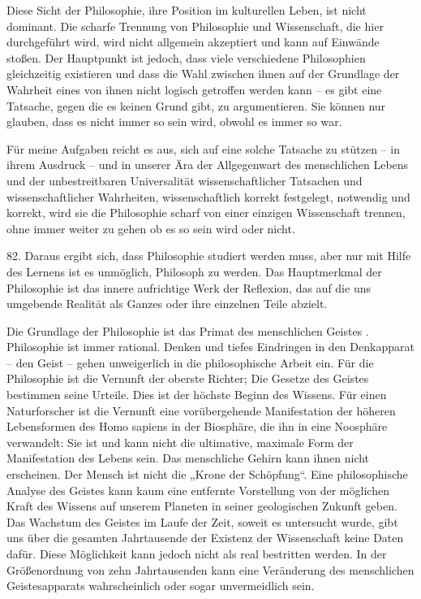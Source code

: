 \documentclass[11pt,a4paper]{book}
\begin{document}
Diese Sicht der Philosophie, ihre Position im kulturellen Leben, ist nicht dominant. Die scharfe Trennung von Philosophie und Wissenschaft, die hier durchgeführt wird, wird nicht allgemein akzeptiert und kann auf Einwände stoßen. Der Hauptpunkt ist jedoch, dass viele verschiedene Philosophien gleichzeitig existieren und dass die Wahl zwischen ihnen auf der Grundlage der Wahrheit eines von ihnen nicht logisch getroffen werden kann -- es gibt eine Tatsache, gegen die es keinen Grund gibt, zu argumentieren. Sie können nur glauben, dass es nicht immer so sein wird, obwohl es immer so war.



Für meine Aufgaben reicht es aus, sich auf eine solche Tatsache zu stützen -- in ihrem Ausdruck -- und in unserer Ära der Allgegenwart des menschlichen Lebens und der unbestreitbaren Universalität wissenschaftlicher Tatsachen und wissenschaftlicher Wahrheiten, wissenschaftlich korrekt festgelegt, notwendig und korrekt, wird sie die Philosophie scharf von einer einzigen Wissenschaft trennen, ohne immer weiter zu gehen ob es so sein wird oder nicht.



82. Daraus ergibt sich, dass Philosophie studiert werden muss, aber nur mit Hilfe des Lernens ist es unmöglich, Philosoph zu werden. Das Hauptmerkmal der Philosophie ist das innere aufrichtige Werk der Reflexion, das auf die uns umgebende Realität als Ganzes oder ihre einzelnen Teile abzielt.



Die Grundlage der Philosophie ist das Primat des menschlichen Geistes . Philosophie ist immer rational. Denken und tiefes Eindringen in den Denkapparat -- den Geist -- gehen unweigerlich in die philosophische Arbeit ein. Für die Philosophie ist die Vernunft der oberste Richter; Die Gesetze des Geistes bestimmen seine Urteile. Dies ist der höchste Beginn des Wissens. Für einen Naturforscher ist die Vernunft eine vorübergehende Manifestation der höheren Lebensformen des Homo sapiens in der Biosphäre, die ihn in eine Noosphäre verwandelt: Sie ist und kann nicht die ultimative, maximale Form der Manifestation des Lebens sein. Das menschliche Gehirn kann ihnen nicht erscheinen. Der Mensch ist nicht die „Krone der Schöpfung“. Eine philosophische Analyse des Geistes kann kaum eine entfernte Vorstellung von der möglichen Kraft des Wissens auf unserem Planeten in seiner geologischen Zukunft geben. Das Wachstum des Geistes im Laufe der Zeit, soweit es untersucht wurde, gibt uns über die gesamten Jahrtausende der Existenz der Wissenschaft keine Daten dafür. Diese Möglichkeit kann jedoch nicht als real bestritten werden. In der Größenordnung von zehn Jahrtausenden kann eine Veränderung des menschlichen Geistesapparats wahrscheinlich oder sogar unvermeidlich sein.
\end{document}
